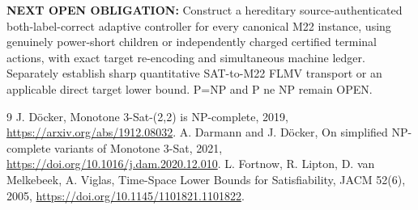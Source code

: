 \documentclass[11pt]{article}
\begin{document}
\textbf{NEXT OPEN OBLIGATION:} Construct a hereditary source-authenticated both-label-correct adaptive controller for every canonical M22 instance, using genuinely power-short children or independently charged certified terminal actions, with exact target re-encoding and simultaneous machine ledger. Separately establish sharp quantitative SAT-to-M22 FLMV transport or an applicable direct target lower bound. P=NP and P ne NP remain OPEN.

\begin{thebibliography}{9}
 J. D\"ocker, Monotone 3-Sat-(2,2) is NP-complete, 2019, \url{https://arxiv.org/abs/1912.08032}.
 A. Darmann and J. D\"ocker, On simplified NP-complete variants of Monotone 3-Sat, 2021, \url{https://doi.org/10.1016/j.dam.2020.12.010}.
 L. Fortnow, R. Lipton, D. van Melkebeek, A. Viglas, Time-Space Lower Bounds for Satisfiability, JACM 52(6), 2005, \url{https://doi.org/10.1145/1101821.1101822}.
\end{thebibliography}
\end{document}
